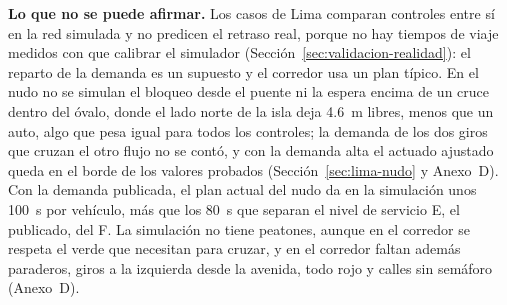 \label{sec:limites}
\noindent\textbf{Lo que no se puede afirmar.} Los casos de Lima comparan
controles entre sí en la red simulada y no predicen el retraso real,
porque no hay tiempos de viaje medidos con que calibrar el simulador
(Sección~\ref{sec:validacion-realidad}): el reparto de la demanda es un
supuesto y el corredor usa un plan típico. En el nudo no se simulan el
bloqueo desde el puente ni la espera encima de un cruce dentro del
óvalo, donde el lado norte de la isla deja 4.6~m libres, menos que un
auto, algo que pesa igual para todos los controles; la demanda de los
dos giros que cruzan el otro flujo no se contó, y con la demanda alta el
actuado ajustado queda en el borde de los valores probados
(Sección~\ref{sec:lima-nudo} y Anexo~D). Con la demanda publicada, el
plan actual del nudo da en la simulación unos 100~s por vehículo, más
que los 80~s que separan el nivel de servicio E, el publicado, del F. La
simulación no tiene peatones, aunque en el corredor se respeta el verde
que necesitan para cruzar, y en el corredor faltan además paraderos,
giros a la izquierda desde la avenida, todo rojo y calles sin semáforo
(Anexo~D).

